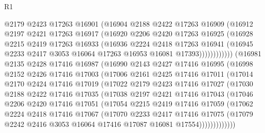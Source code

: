\begin{lexlean}{R1}
\begin{coremodule}
                @2179
                @2423
                @17263
                @16901
                (@16904
                  @2188
                  @2422
                  @17263
                  @16909
                  (@16912
                    @2197
                    @2421
                    @17263
                    @16917
                    (@16920
                      @2206
                      @2420
                      @17263
                      @16925
                      (@16928
                        @2215
                        @2419
                        @17263
                        @16933
                        (@16936
                          @2224
                          @2418
                          @17263
                          @16941
                          (@16945 @2233 @2417 @3053 @16064 @17263 @16953 @16081 @17393))))))))))))
    (@16981
      @2135
      @2428
      @17416
      @16987
      (@16990
        @2143
        @2427
        @17416
        @16995
        (@16998
          @2152
          @2426
          @17416
          @17003
          (@17006
            @2161
            @2425
            @17416
            @17011
            (@17014
              @2170
              @2424
              @17416
              @17019
              (@17022
                @2179
                @2423
                @17416
                @17027
                (@17030
                  @2188
                  @2422
                  @17416
                  @17035
                  (@17038
                    @2197
                    @2421
                    @17416
                    @17043
                    (@17046
                      @2206
                      @2420
                      @17416
                      @17051
                      (@17054
                        @2215
                        @2419
                        @17416
                        @17059
                        (@17062
                          @2224
                          @2418
                          @17416
                          @17067
                          (@17070
                            @2233
                            @2417
                            @17416
                            @17075
                            (@17079
                              @2242
                              @2416
                              @3053
                              @16064
                              @17416
                              @17087
                              @16081
                              @17554)))))))))))))

\end{coremodule}
\end{lexlean}
